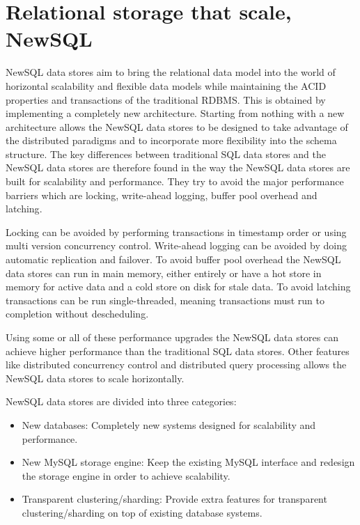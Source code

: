 \section{Relational storage that scale, NewSQL}
\label{sec:newsql}
NewSQL data stores aim to bring the relational data model into the world of horizontal scalability and flexible data models while maintaining the ACID properties and transactions of the traditional RDBMS\cite{Cattell:ScalableSQLAndNoSQLDataStores}.
This is obtained by implementing a completely new architecture\cite{CORBETT:SpannerGooglesGloballyDistributedDatabase}.
Starting from nothing with a new architecture allows the NewSQL data stores to be designed to take advantage of the distributed paradigms and to incorporate more flexibility into the schema structure.
The key differences between traditional SQL data stores and the NewSQL data stores are therefore found in the way the NewSQL data stores are built for scalability and performance.
They try to avoid the major performance barriers which are locking, write-ahead logging, buffer pool overhead and latching\cite{Stonebraker:NewSQLvsNoSQLForNewOLTP}.

Locking can be avoided by performing transactions in timestamp order or using multi version concurrency control.
Write-ahead logging can be avoided by doing automatic replication and failover.
To avoid buffer pool overhead the NewSQL data stores can run in main memory, either entirely or have a hot store in memory for active data and a cold store on disk for stale data.
To avoid latching transactions can be run single-threaded, meaning transactions must run to completion without descheduling.

Using some or all of these performance upgrades the NewSQL data stores can achieve higher performance than the traditional SQL data stores.
Other features like distributed concurrency control and distributed query processing allows the NewSQL data stores to scale horizontally.

NewSQL data stores are divided into three categories\cite{Prasanns:NewSQLTheNewWayToHandleBigData}:

\begin{itemize}
\item New databases: Completely new systems designed for scalability and performance.
\item New MySQL storage engine: Keep the existing MySQL interface and redesign the storage engine in order to achieve scalability.
\item Transparent clustering/sharding: Provide extra features for transparent clustering/sharding on top of existing database systems. 
\end{itemize}


